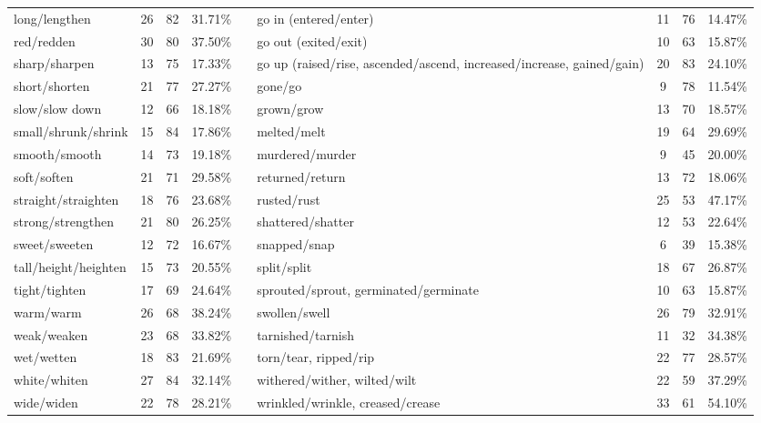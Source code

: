 \begin{tabular}{p{3cm}ccccp{3cm}ccc}
long/lengthen & 26 & 82 & 31.71\% & & go in (entered/enter) & 11 & 76 & 14.47\% \\
red/redden & 30 & 80 & 37.50\% & & go out (exited/exit) & 10 & 63 & 15.87\% \\
sharp/sharpen & 13 & 75 & 17.33\% & & go up (raised/rise, ascended/ascend, increased/increase, gained/gain) & 20 & 83 & 24.10\% \\
short/shorten & 21 & 77 & 27.27\% & & gone/go & 9 & 78 & 11.54\% \\
slow/slow down & 12 & 66 & 18.18\% & & grown/grow & 13 & 70 & 18.57\% \\
small/shrunk/shrink & 15 & 84 & 17.86\% & & melted/melt & 19 & 64 & 29.69\% \\
smooth/smooth & 14 & 73 & 19.18\% & & murdered/murder & 9 & 45 & 20.00\% \\
soft/soften & 21 & 71 & 29.58\% & & returned/return & 13 & 72 & 18.06\% \\
straight/straighten & 18 & 76 & 23.68\% & & rusted/rust & 25 & 53 & 47.17\% \\
strong/strengthen & 21 & 80 & 26.25\% & & shattered/shatter & 12 & 53 & 22.64\% \\
sweet/sweeten & 12 & 72 & 16.67\% & & snapped/snap & 6 & 39 & 15.38\% \\
tall/height/heighten & 15 & 73 & 20.55\% & & split/split & 18 & 67 & 26.87\% \\
tight/tighten & 17 & 69 & 24.64\% & & sprouted/sprout, germinated/germinate & 10 & 63 & 15.87\% \\
warm/warm & 26 & 68 & 38.24\% & & swollen/swell & 26 & 79 & 32.91\% \\
weak/weaken & 23 & 68 & 33.82\% & & tarnished/tarnish & 11 & 32 & 34.38\% \\
wet/wetten & 18 & 83 & 21.69\% & & torn/tear, ripped/rip & 22 & 77 & 28.57\% \\
white/whiten & 27 & 84 & 32.14\% & & withered/wither, wilted/wilt & 22 & 59 & 37.29\% \\
wide/widen & 22 & 78 & 28.21\% & & wrinkled/wrinkle, creased/crease & 33 & 61 & 54.10\%
\end{tabular}
